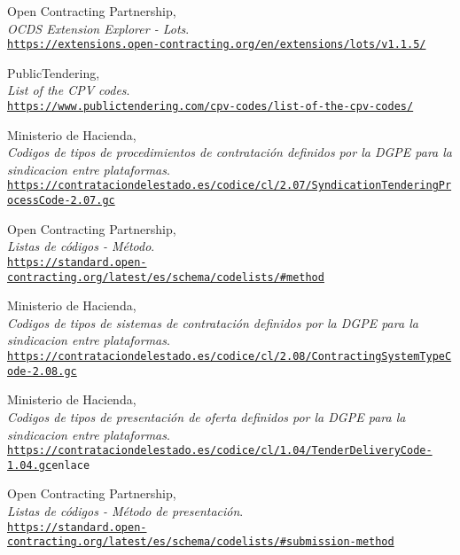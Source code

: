 \begin{thebibliography}{X}
            Open Contracting Partnership,
            \\ \textit{OCDS Extension Explorer - Lots}.
            \\ \texttt{\url{https://extensions.open-contracting.org/en/extensions/lots/v1.1.5/}}
            
            PublicTendering,
            \\ \textit{List of the CPV codes}.
            \\ \texttt{\url{https://www.publictendering.com/cpv-codes/list-of-the-cpv-codes/}}
            
            Ministerio de Hacienda,
            \\ \textit{Codigos de tipos de procedimientos de contratación definidos por la DGPE para la sindicacion entre plataformas}.
            \\ \texttt{\url{https://contrataciondelestado.es/codice/cl/2.07/SyndicationTenderingProcessCode-2.07.gc}}
            
            Open Contracting Partnership,
            \\ \textit{Listas de códigos - Método}.
            \\ \texttt{\url{https://standard.open-contracting.org/latest/es/schema/codelists/\#method}}
            
            Ministerio de Hacienda,
            \\ \textit{Codigos de tipos de sistemas de contratación definidos por la DGPE para la sindicacion entre plataformas}.
            \\ \texttt{\url{https://contrataciondelestado.es/codice/cl/2.08/ContractingSystemTypeCode-2.08.gc}}
            
            Ministerio de Hacienda,
            \\ \textit{Codigos de tipos de presentación de oferta definidos por la DGPE para la sindicacion entre plataformas}.
            \\ \texttt{\url{https://contrataciondelestado.es/codice/cl/1.04/TenderDeliveryCode-1.04.gc}{enlace}}
            
            Open Contracting Partnership,
            \\ \textit{Listas de códigos - Método de presentación}.
            \\ \texttt{\url{https://standard.open-contracting.org/latest/es/schema/codelists/\#submission-method}}
            

\end{thebibliography}
